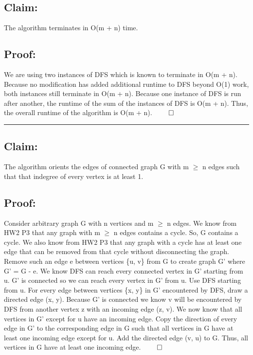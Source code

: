 \documentclass[11pt]{article}
\begin{document}
\subsection*{Claim:} 
The algorithm terminates in O(m + n) time. 

\subsection*{Proof:}
We are using two instances of DFS which is known to terminate in O(m + n). Because no modification has added additional runtime to DFS beyond O(1) work, both instances still terminate in O(m + n). Because one instance of DFS is run after another, the runtime of the sum of the instances of DFS is O(m + n). Thus, the overall runtime of the algorithm is O(m + n). $\qed$

\noindent\textcolor[RGB]{220,220,220}{\rule{\linewidth}{0.8pt}}

\subsection*{Claim:} 
The algorithm orients the edges of connected graph G with m $\geq$ n edges such that that indegree of every vertex is at least 1.

\subsection*{Proof:}
Consider arbitrary graph G with n vertices and m $\geq$ n edges. 
We know from HW2 P3 that any graph with m $\geq$ n edges contains a cycle. So, G contains a cycle. We also know from HW2 P3 that any graph with a cycle has at least one edge that can be removed from that cycle without disconnecting the graph. Remove such an edge e between vertices \{u, v\} from G to create graph G' where G' = G - e. We know DFS can reach every connected vertex in G' starting from u. G' is connected so we can reach every vertex in G' from u. Use DFS starting from u. For every edge between vertices \{x, y\} in G' encountered by DFS, draw a directed edge (x, y). Because G' is connected we know v will be encountered by DFS from another vertex z with an incoming edge (z, v). We now know that all vertices in G' except for u have an incoming edge. Copy the direction of every edge in G' to the corresponding edge in G such that all vertices in G have at least one incoming edge except for u. Add the directed edge (v, u) to G. Thus, all vertices in G have at least one incoming edge. $\qed$
\end{document}
